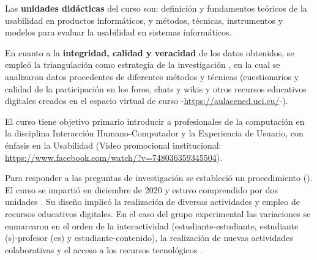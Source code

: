 \documentclass[spanish]{textolivre}
\begin{document}
Las \textbf{unidades didácticas} del curso son: definición y fundamentos teóricos de la usabilidad en productos informáticos, y métodos, técnicas, instrumentos y modelos para evaluar la usabilidad en sistemas informáticos.

En cuanto a la \textbf{integridad, calidad y veracidad} de los datos obtenidos, se empleó la triangulación como estrategia de la investigación \cite{luo2018}, %
en la cual se analizaron datos procedentes de diferentes métodos y técnicas (cuestionarios y calidad de la participación en los foros, chats y wikis y otros recursos educativos digitales creados en el espacio virtual de curso -\url{https://aulacened.uci.cu/}-).

El curso tiene objetivo primario introducir a profesionales de la computación en la disciplina Interacción Humano-Computador y la Experiencia de Usuario, con énfasis en la Usabilidad (Video promocional institucional: \url{https://www.facebook.com/watch/?v=748036359345504}).

Para responder a las preguntas de investigación se estableció un procedimiento (). El curso  se impartió en diciembre de 2020 y estuvo comprendido por dos unidades . Su diseño implicó la realización de diversas actividades y empleo de recursos educativos digitales. En el caso del grupo experimental las variaciones se enmarcaron en el orden de la interactividad (estudiante-estudiante, estudiante (s)-profesor (es) y estudiante-contenido), la realización de nuevas actividades colaborativas y el acceso a los recursos tecnológicos .
\end{document}
